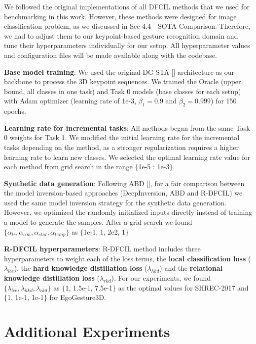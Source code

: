 \documentclass[11pt]{article}
\begin{document}
We followed the original implementations of all DFCIL methods that we used for benchmarking in this work. However, these methods were designed for image classification problem, as we discussed in Sec 4.4 - SOTA Comparison. Therefore, we had to adjust them to our keypoint-based gesture recognition domain and tune their hyperparameters individually for our setup. All hyperparameter values and configuration files will be made available along with the codebase.

\noindent \textbf{Base model training}: We used the original DG-STA [] architecture as our backbone to process the 3D keypoint sequences. We trained the Oracle (upper bound, all classes in one task) and Task 0 models (base classes for each setup) with Adam optimizer (learning rate of 1e-3, $\beta_{1}=0.9$ and $\beta_{2}=0.999$) for 150 epochs. 

\noindent \textbf{Learning rate for incremental tasks}: All methods began from the same Task 0 weights for Task 1. We modified the initial learning rate for the incremental tasks depending on the method, as a stronger regularization requires a higher learning rate to learn new classes. We selected the optimal learning rate value for each method from grid search in the range $\{$1e-5 : 1e-3$\}$.

\noindent \textbf{Synthetic data generation}: Following ABD [], for a fair comparison between the model inversion-based approaches (DeepInversion, ABD and R-DFCIL) we used the same model inversion strategy for the synthetic data generation. However, we optimized the randomly initialized inputs directly instead of training a model to generate the samples. After a grid search we found $\{\alpha_{lr}, \alpha_{con}, \alpha_{stat}, \alpha_{temp}\}$ as $\{$1e-1, 1, 2e2, 1$\}$

\noindent \textbf{R-DFCIL hyperparameters}: R-DFCIL method includes three hyperparameters to weight each of the loss terms, the \textbf{local classification loss} ($\lambda_{lce}$), the \textbf{hard knowledge distillation loss} ($\lambda_{hkd}$) and the \textbf{relational knowledge distillation loss} ($\lambda_{rkd}$). For our experiments, we found $\{\lambda_{lce}, \lambda_{hkd}, \lambda_{rkd}\}$ as $\{$1, 1.5e-1, 7.5e-1$\}$ as the optimal values for SHREC-2017 and $\{$1, 1e-1, 1e-1$\}$ for EgoGesture3D.





\section{Additional Experiments}
\end{document}
